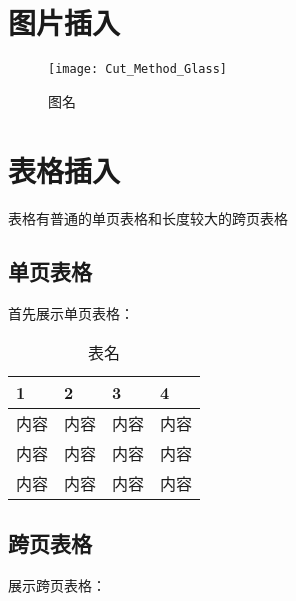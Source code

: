 \documentclass[a4paper,AutoFakeBold={2.7}]{ctexart} %
\begin{document}
\section{图片插入}
\begin{figure}[htbp]
	\centering
	\texttt{[image: Cut\_Method\_Glass]}
	\caption{图名}\label{图名}
\end{figure}
\section{表格插入}
表格有普通的单页表格和长度较大的跨页表格
\subsection{单页表格}
首先展示单页表格：

\begin{table}[htbp]%
	\caption{表名}\label{表名}
	\centering
	\begin{tabular}{p{3cm}<{\centering} p{3cm}<{\centering} p{3cm}<{\centering} p{3cm}<{\centering}}
		\toprule[1.5pt]
		1&2&3&4\\
		\midrule[0.75pt]
		内容&内容&内容&内容\\
		内容&内容&内容&内容\\
		内容&内容&内容&内容\\
		\bottomrule[1pt]
	\end{tabular}
\end{table}

\subsection{跨页表格}
展示跨页表格：
\end{document}
